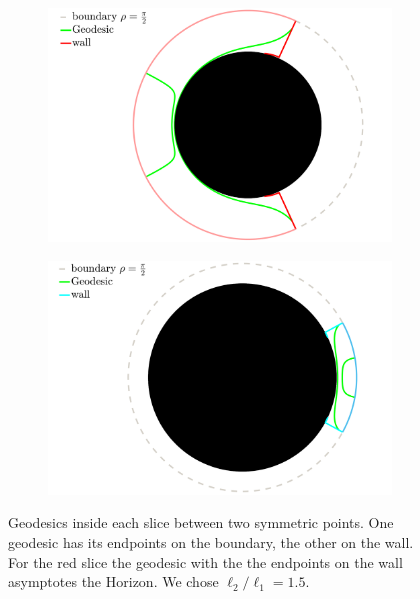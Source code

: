 \begin{figure}
    \centering
    \begin{subfigure}[b]{0.45\textwidth}
        \centering
        \includegraphics[width=\textwidth]{figures/geodesic_red.png}
        \label{greengeodesic}
    \end{subfigure}
    \hfill
    \begin{subfigure}[b]{0.45\textwidth}
        \centering
        \includegraphics[width=\textwidth]{figures/geodesic_blue.png}
        \label{pinkgeodesic}
    \end{subfigure}
        \caption{Geodesics inside each slice between two symmetric points. One geodesic has its endpoints on the boundary, the other on the wall. For the red slice the geodesic with the the endpoints on the wall asymptotes the Horizon. We chose $\ell_2/\ell_1=1.5$.}
        \label{geodesic pic}
\end{figure}

